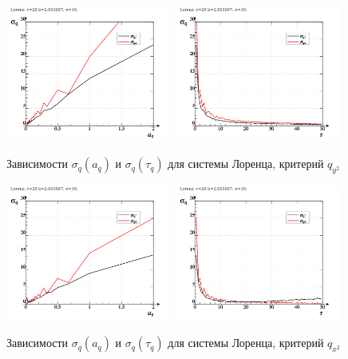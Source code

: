 \begin{figure}[ht!]
\begin{center}
  \includegraphics[width=0.49\textwidth]{p/cha/lor/lor_q_tau-p_aq_sd.png}
  \hfill
  \includegraphics[width=0.49\textwidth]{p/cha/lor/lor_q_tau-p_tau_sd.png}
\end{center}
  \caption{Зависимости $\sigma_{q}(a_q)$ и $\sigma_{q}(\tau_q)$ для системы Лоренца, критерий  $q_{y^2}$}
\label{atu:f:lor_qy2_tau}
\end{figure}


\begin{figure}[ht!]
\begin{center}
  \includegraphics[width=0.49\textwidth]{p/cha/lor/lor_qx2_tau-p_aq_sd.png}
  \hfill
  \includegraphics[width=0.49\textwidth]{p/cha/lor/lor_qx2_tau-p_tau_sd.png}
\end{center}
  \caption{Зависимости $\sigma_{q}(a_q)$ и $\sigma_{q}(\tau_q)$ для системы Лоренца, критерий $q_{x^2}$}
\label{atu:f:lor_qx2_tau}
\end{figure}

